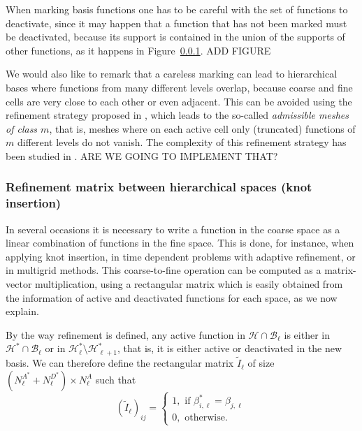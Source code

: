 \documentclass[a4paper]{siamltex1213}
\newcommand{\Rd}{\color{red}}
\newcommand\BB{\mathcal B}
\newcommand\HH{\mathcal H}
\let\tilde\widetilde
\begin{document}
When marking basis functions one has to be careful with the set of functions to deactivate, since it may happen that a function that has not been marked must be deactivated, because its support is contained in the union of the supports of other functions, as it happens in Figure~\ref{}. {\Rd ADD FIGURE}

We would also like to remark that a careless marking can lead to hierarchical bases where functions from many different levels overlap, because coarse and fine cells are very close to each other or even adjacent. This can be avoided using the refinement strategy proposed in \cite{BGi15}, which leads to the so-called \emph{admissible meshes of class $m$}, that is, meshes where on each active cell only (truncated) functions of $m$ different levels do not vanish. The complexity of this refinement strategy has been studied in \cite{BGMP15}. {\Rd ARE WE GOING TO IMPLEMENT THAT?}

\subsubsection{Refinement matrix between hierarchical spaces (knot insertion)}
In several occasions it is necessary to write a function in the coarse space as a linear combination of functions in the fine space. This is done, for instance, when applying knot insertion, in time dependent problems with adaptive refinement, or in multigrid methods. This coarse-to-fine operation can be computed as a matrix-vector multiplication, using a rectangular matrix which is easily obtained from the information of active and deactivated functions for each space, as we now explain.

By the way refinement is defined, any active function in $\HH \cap \BB_\ell$ is either in $\HH^* \cap \BB_\ell$ or in $\HH_\ell^* \setminus \HH^*_{\ell+1}$, that is, it is either active or deactivated in the new basis. We can therefore define the rectangular matrix $\tilde I_\ell$ of size $(N^{A^*}_{\ell} + N^{D^*}_{\ell}) \times N^A_\ell$ such that 
\begin{equation*}
(\tilde I_\ell)_{ij} = \left \{ 
\begin{array}{l}
1, \text{ if }  \beta^{*}_{i,\ell} = \beta_{j,\ell}\\
0, \text{ otherwise. }
\end{array}
\right.
\end{equation*}
\end{document}

